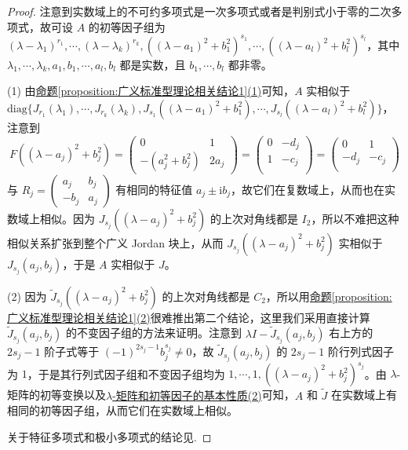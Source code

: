 \documentclass[../../main.tex]{subfiles}%
\begin{document}
\begin{proof}
注意到实数域上的不可约多项式是一次多项式或者是判别式小于零的二次多项式，故可设 $A$ 的初等因子组为 $(\lambda - \lambda_1)^{r_1},\cdots,(\lambda - \lambda_k)^{r_k},((\lambda - a_1)^2 + b_1^2)^{s_1},\cdots,((\lambda - a_l)^2 + b_l^2)^{s_l}$，其中 $\lambda_1,\cdots,\lambda_k,a_1,b_1,\cdots,a_l,b_l$ 都是实数，且 $b_1,\cdots,b_l$ 都非零。

(1) 由\hyperref[proposition:广义标准型理论相关结论1]{命题\ref{proposition:广义标准型理论相关结论1}(1)}可知，$A$ 实相似于 $\mathrm{diag}\{J_{r_1}(\lambda_1),\cdots,J_{r_k}(\lambda_k),J_{s_1}((\lambda - a_1)^2 + b_1^2),\cdots,J_{s_l}((\lambda - a_l)^2 + b_l^2)\}$，注意到 
$$
F((\lambda - a_j)^2 + b_j^2) = \begin{pmatrix}0 & 1 \\ -(a_j^2 + b_j^2) & 2a_j\end{pmatrix}=\left( \begin{matrix}
0&		-d_j\\
1&		-c_j\\
\end{matrix} \right) =\left( \begin{matrix}
0&		1\\
-d_j&		-c_j\\
\end{matrix} \right) 
$$
与 $R_j = \begin{pmatrix}a_j & b_j \\ -b_j & a_j\end{pmatrix}$ 有相同的特征值 $a_j\pm \mathrm{i}b_j$，故它们在复数域上，从而也在实数域上相似。因为 $J_{s_j}((\lambda - a_j)^2 + b_j^2)$ 的上次对角线都是 $I_2$，所以不难把这种相似关系扩张到整个广义 Jordan 块上，从而 $J_{s_j}((\lambda - a_j)^2 + b_j^2)$ 实相似于 $J_{s_j}(a_j,b_j)$，于是 $A$ 实相似于 $J$。

(2) 因为 $\widetilde{J}_{s_j}((\lambda - a_j)^2 + b_j^2)$ 的上次对角线都是 $C_2$，所以用\hyperref[proposition:广义标准型理论相关结论1]{命题\ref{proposition:广义标准型理论相关结论1}(2)}很难推出第二个结论，这里我们采用直接计算 $\widetilde{J}_{s_j}(a_j,b_j)$ 的不变因子组的方法来证明。注意到 $\lambda I - \widetilde{J}_{s_j}(a_j,b_j)$ 右上方的 $2s_j - 1$ 阶子式等于 $(-1)^{2s_j - 1}b_j^{s_j}\neq 0$，故 $\widetilde{J}_{s_j}(a_j,b_j)$ 的 $2s_j - 1$ 阶行列式因子为 $1$，于是其行列式因子组和不变因子组均为 $1,\cdots,1,((\lambda - a_j)^2 + b_j^2)^{s_j}$。由 $\lambda$-矩阵的初等变换以及\hyperref[theorem:lambda-矩阵和初等因子的基本性质]{$\lambda$-矩阵和初等因子的基本性质(2)}可知，$A$ 和 $\widetilde{J}$ 在实数域上有相同的初等因子组，从而它们在实数域上相似。

关于特征多项式和极小多项式的结论见.
\end{proof}
\end{document}
